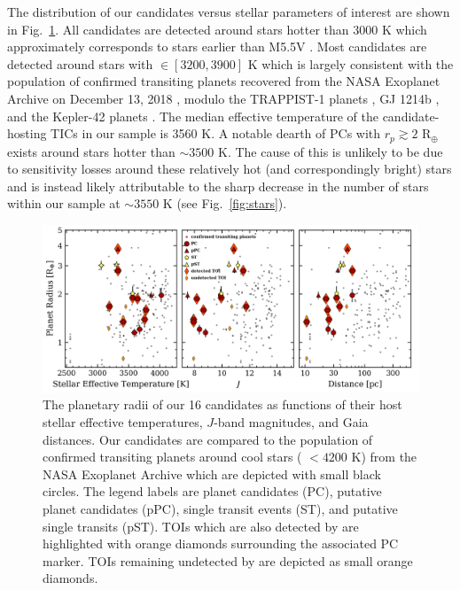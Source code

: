 The distribution of our candidates versus stellar parameters of interest are shown in
Fig.~\ref{fig:planetstar}. All candidates are detected around stars hotter than 3000 K which
approximately corresponds to stars earlier than M5.5V \citep{pecaut13}. Most candidates
are detected around stars with \teff{} $\in [3200,3900]$ K which is largely consistent with the
population of confirmed transiting planets recovered from the NASA Exoplanet Archive on
December 13, 2018 \citep{akeson13}, modulo the TRAPPIST-1 planets \citep{gillon17}, GJ 1214b
\citep{charbonneau09}, and the Kepler-42 planets \citep{muirhead12b}. The median effective
temperature of the candidate-hosting TICs in our sample is 3560 K. A notable dearth of PCs
with $r_p \gtrsim 2$ R$_{\oplus}$ exists around stars hotter than $\sim 3500$ K. The cause of
this is unlikely to be due to sensitivity losses around these relatively hot (and correspondingly
bright) stars and is instead likely attributable to the sharp decrease in the number of stars
within our sample at \teff{} $\sim 3550$ K (see Fig.~\ref{fig:stars}). \\

\begin{figure}
  \centering
  \includegraphics[width=0.9\hsize]{figures/planetsample_star.png}
  \caption[Stellar parameters for the \texttt{ORION} planet candidate sample host stars.]
      {The planetary radii of our 16 \pipeline{} candidates as functions of their host stellar
    effective temperatures, $J$-band magnitudes, and Gaia distances. Our candidates
    are compared to the population of confirmed transiting planets around cool stars (\teff{} $<4200$
    K) from the NASA Exoplanet Archive which are depicted with small black circles.
    The legend labels are planet candidates (PC), 
    putative planet candidates (pPC), 
    single transit events (ST), and  putative single transits (pST).
    TOIs which are also detected by \pipeline{} are highlighted with
    orange diamonds surrounding the associated PC marker. TOIs remaining undetected by \pipeline{}
    are depicted as small orange diamonds.}
  \label{fig:planetstar}
\end{figure}

